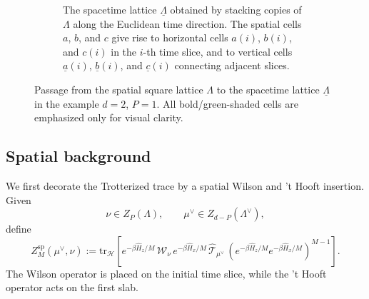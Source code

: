 \documentclass[dvipsnames,a4paper]{article}
\numberwithin{equation}{section}
\theoremstyle{definition}
\theoremstyle{remark}
\newcommand{\tr}{\mathrm{tr}}
\begin{document}
\begin{figure}[h]
\begin{subfigure}[t]{0.48\textwidth}
		\caption{The spacetime lattice \(\underline{\Lambda}\) obtained by stacking copies of \(\Lambda\) along the Euclidean time direction. The spatial cells \(a\), \(b\), and \(c\) give rise to horizontal cells \(a(i)\), \(b(i)\), and \(c(i)\) in the \(i\)-th time slice, and to vertical cells \(\underline a(i)\), \(\underline b(i)\), and \(\underline c(i)\) connecting adjacent slices.}
		\label{fig:spacetimeL}
	\end{subfigure}
	
	\caption{Passage from the spatial square lattice \(\Lambda\) to the spacetime lattice \(\underline{\Lambda}\) in the example \(d=2\), \(P=1\). All bold/green-shaded cells are emphasized only for visual clarity.}
	\label{fig:space2spacetime}
\end{figure}



\subsection{Spatial background}
\label{sec:trotter-with-insertions}

We first decorate the Trotterized trace by a spatial Wilson and 't Hooft insertion. Given
\begin{equation}
\nu\in Z_P(\Lambda),
\qquad
\mu^\vee\in Z_{d-P}(\Lambda^\vee),
\end{equation}
define
\begin{equation}
	Z_M^{\mathrm{sp}}(\mu^\vee,\nu)
	:=
	\tr_{\mathcal H}
	\left[
	e^{-\beta\hat H_z/M}\,
	\hat{\mathcal W}_\nu\,
	e^{-\beta\hat H_x/M}\,
	\hat{\mathcal T}_{\mu^\vee}\,
	\left(e^{-\beta\hat H_z/M}e^{-\beta\hat H_x/M}\right)^{M-1}
	\right].
	\label{eq:WTtrotter}
\end{equation}
The Wilson operator is placed on the initial time slice, while the 't Hooft operator acts
on the first slab.
\end{document}
